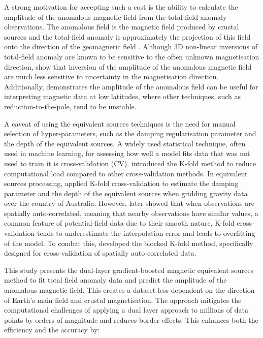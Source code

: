 A strong motivation for accepting such a cost is the ability to calculate the amplitude of the anomalous magnetic field from the total-field anomaly observations. The anomalous field is the magnetic field produced by crustal sources and the total-field anomaly is approximately the projection of this field onto the direction of the geomagnetic field \citep{Blakley1995}. Although 3D non-linear inversions of total-field anomaly are known to be sensitive to the often unknown magnetisation direction, \citet{HidalgoGato2021} show that inversion of the amplitude of the anomalous magnetic field are much less sensitive to uncertainty in the magnetisation direction. Additionally, \citet{Melo2021} demonstrates the amplitude of the anomalous field can be useful for interpreting magnetic data at low latitudes, where other techniques, such as reduction-to-the-pole, tend to be unstable.

A caveat of using the equivalent sources techniques is the need for manual selection of hyper-parameters, such as the damping regularisation parameter and the depth of the equivalent sources. A widely used statistical technique, often used in machine learning, for assessing how well a model fits data that was not used to train it is cross-validation (CV). \citet{Geisser1975} introduced the K-fold method to reduce computational load compared to other cross-validation methods. 
In equivalent sources processing, \citet{Soler2021} applied K-fold cross-validation to estimate the damping parameter and the depth of the equivalent sources when gridding gravity data over the country of Australia. However, \citet{Roberts2017} later showed that when observations are spatially auto-correlated, meaning that nearby observations have similar values, a common feature of potential-field data due to their smooth nature, K-fold cross-validation tends to underestimate the interpolation error and leads to overfitting of the model. To combat this, \citet{Roberts2017} developed the blocked K-fold method, specifically designed for cross-validation of spatially auto-correlated data. 

This study presents the dual-layer gradient-boosted magnetic equivalent sources method to fit total field anomaly data and predict the amplitude of the anomalous magnetic field. This creates a dataset less dependent on the direction of Earth’s main field and crustal magnetisation. The approach mitigates the computational challenges of applying a dual layer approach to millions of data points by orders of magnitude and reduces border effects. This enhances both the efficiency and the accuracy by:

